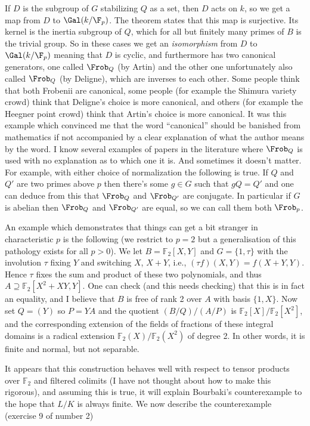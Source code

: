 If $D$ is the subgroup of $G$ stabilizing $Q$ as a set, then $D$ acts on $k$, so we get
a map from $D$ to $\Gal(k/\F_p)$. The theorem states that this map is surjective.
Its kernel is the inertia subgroup of $Q$, which for all but finitely many primes of $B$
is the trivial group. So in these cases we get an \emph{isomorphism} from $D$ to $\Gal(k/\F_p)$
meaning that $D$ is cyclic, and furthermore has two canonical generators, one called $\Frob_Q$
(by Artin) and the other one unfortunately also called $\Frob_Q$ (by Deligne), which are inverses
to each other. Some people think that both Frobenii are canonical, some people (for example
the Shimura variety crowd) think that Deligne's choice is more canonical, and others
(for example the Heegner point crowd) think that Artin's choice is more canonical.
It was this example which convinced me that the word ``canonical'' should be banished
from mathematics if not accompanied by a clear explanation of what the author means
by the word. I know several examples of papers in the literature where $\Frob_Q$ is
used with no explanation as to which one it is. And sometimes it doesn't matter.
For example, with either choice of normalization the following is true.
If $Q$ and $Q'$ are two primes above $p$ then there's some $g\in G$ such that
$gQ=Q'$ and one can deduce from this that $\Frob_Q$ and $\Frob_{Q'}$ are conjugate. In particular
if $G$ is abelian then $\Frob_Q$ and $\Frob_{Q'}$ are equal, so we can call them both $\Frob_p$.

An example which demonstrates that things can get a bit stranger in characteristic $p$ is the
following (we restrict to $p=2$ but a generalisation of this pathology exists for all $p>0$).
We let $B=\mathbb{F}_2[X,Y]$ and $G=\{1,\tau\}$ with the involution $\tau$
fixing $Y$ and switching $X$, $X+Y$, i.e., $(\tau f)(X,Y)=f(X+Y, Y)$.
Hence $\tau$ fixes the sum and product of these two polynomials, and thus
$A\supseteq \mathbb{F}_2[X^2+XY,Y]$. One can check (and this needs checking) that this
is in fact an equality, and I believe that $B$ is free of
rank 2 over $A$ with basis $\{1,X\}$.
Now set $Q=(Y)$ so $P=YA$ and the quotient $(B/Q)/(A/P)$ is
$\mathbb{F}_2[X]/\mathbb{F}_2[X^2]$, and the corresponding extension
of the fields of fractions of these integral domains is a radical extension
$\mathbb{F}_2(X)/\mathbb{F}_2(X^2)$ of degree 2.
In other words, it is finite and normal, but not separable.

It appears that this construction behaves well with respect to tensor
products over $\mathbb{F}_2$ and filtered colimits (I have not thought about
how to make this rigorous), and assuming this is true, it will explain Bourbaki's
counterexample to the hope that $L/K$ is always finite. We now describe the counterexample
(exercise 9 of number 2)

